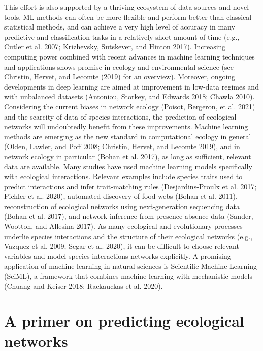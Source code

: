 \documentclass[11pt]{article}
\begin{document}
This effort is also supported by a thriving ecosystem of data sources
and novel tools. ML methods can often be more flexible and perform
better than classical statistical methods, and can achieve a very high
level of accuracy in many predictive and classification tasks in a
relatively short amount of time (e.g., Cutler et al. 2007; Krizhevsky,
Sutskever, and Hinton 2017). Increasing computing power combined with
recent advances in machine learning techniques and applications shows
promise in ecology and environmental science (see Christin, Hervet, and
Lecomte (2019) for an overview). Moreover, ongoing developments in deep
learning are aimed at improvement in low-data regimes and with
unbalanced datasets (Antoniou, Storkey, and Edwards 2018; Chawla 2010).
Considering the current biases in network ecology (Poisot, Bergeron, et
al. 2021) and the scarcity of data of species interactions, the
prediction of ecological networks will undoubtedly benefit from these
improvements. Machine learning methods are emerging as the new standard
in computational ecology in general (Olden, Lawler, and Poff 2008;
Christin, Hervet, and Lecomte 2019), and in network ecology in
particular (Bohan et al. 2017), as long as sufficient, relevant data are
available. Many studies have used machine learning models specifically
with ecological interactions. Relevant examples include species traits
used to predict interactions and infer trait-matching rules
(Desjardins-Proulx et al. 2017; Pichler et al. 2020), automated
discovery of food webs (Bohan et al. 2011), reconstruction of ecological
networks using next-generation sequencing data (Bohan et al. 2017), and
network inference from presence-absence data (Sander, Wootton, and
Allesina 2017). As many ecological and evolutionary processes underlie
species interactions and the structure of their ecological networks
(e.g., Vazquez et al. 2009; Segar et al. 2020), it can be difficult to
choose relevant variables and model species interactions networks
explicitly. A promising application of machine learning in natural
sciences is Scientific-Machine Learning (SciML), a framework that
combines machine learning with mechanistic models (Chuang and Keiser
2018; Rackauckas et al. 2020).

\hypertarget{a-primer-on-predicting-ecological-networks}{%
\section{A primer on predicting ecological
networks}\label{a-primer-on-predicting-ecological-networks}}
\end{document}
